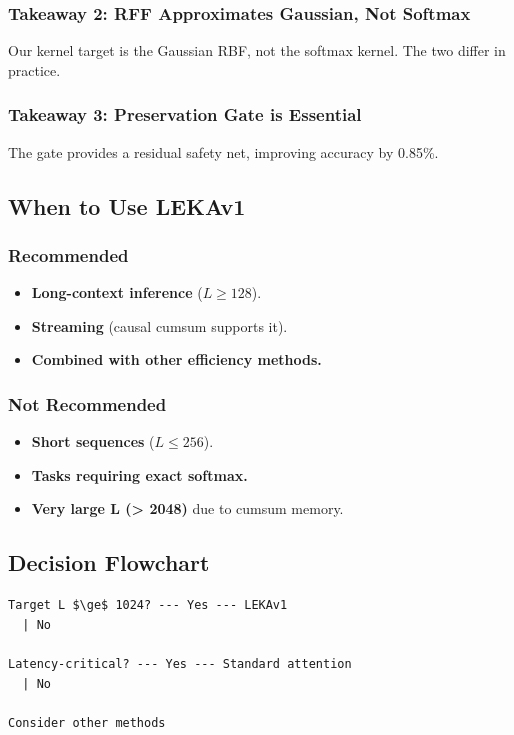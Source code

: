 \subsubsection{Takeaway 2: RFF Approximates Gaussian, Not Softmax}

Our kernel target is the Gaussian RBF, not the softmax kernel. The two 
differ in practice.

\subsubsection{Takeaway 3: Preservation Gate is Essential}

The gate provides a residual safety net, improving accuracy by 
0.85\%.

\subsection{When to Use LEKAv1}

\subsubsection{Recommended}
\begin{itemize}
\item \textbf{Long-context inference} ($L \geq 128$).
\item \textbf{Streaming} (causal cumsum supports it).
\item \textbf{Combined with other efficiency methods.}

\end{itemize}
\subsubsection{Not Recommended}
\begin{itemize}
\item \textbf{Short sequences} ($L \leq 256$).
\item \textbf{Tasks requiring exact softmax.}
\item \textbf{Very large L (\textgreater{} 2048)} due to cumsum memory.

\end{itemize}
\subsection{Decision Flowchart}

\begin{lstlisting}
Target L $\ge$ 1024? --- Yes --- LEKAv1
  | No
   
Latency-critical? --- Yes --- Standard attention
  | No
   
Consider other methods
\end{lstlisting}

